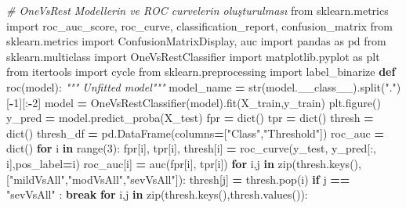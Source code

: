 \documentclass[12pt,twoside]{deuthesis}
\newenvironment{Shaded}{\begin{snugshade}}{\end{snugshade}}
\newcommand{\BuiltInTok}[1]{#1}
\newcommand{\CommentTok}[1]{\textcolor[rgb]{0.56,0.35,0.01}{\textit{#1}}}
\newcommand{\ControlFlowTok}[1]{\textcolor[rgb]{0.13,0.29,0.53}{\textbf{#1}}}
\newcommand{\DecValTok}[1]{\textcolor[rgb]{0.00,0.00,0.81}{#1}}
\newcommand{\ImportTok}[1]{#1}
\newcommand{\KeywordTok}[1]{\textcolor[rgb]{0.13,0.29,0.53}{\textbf{#1}}}
\newcommand{\NormalTok}[1]{#1}
\newcommand{\OperatorTok}[1]{\textcolor[rgb]{0.81,0.36,0.00}{\textbf{#1}}}
\newcommand{\StringTok}[1]{\textcolor[rgb]{0.31,0.60,0.02}{#1}}
\begin{document}
\scriptsize
\begin{Shaded}
\begin{Highlighting}[]
\CommentTok{\# OneVsRest Modellerin ve ROC curvelerin oluşturulması}
\ImportTok{from}\NormalTok{ sklearn.metrics }\ImportTok{import}\NormalTok{ roc\_auc\_score, roc\_curve, classification\_report, confusion\_matrix}
\ImportTok{from}\NormalTok{ sklearn.metrics }\ImportTok{import}\NormalTok{ ConfusionMatrixDisplay, auc}
\ImportTok{import}\NormalTok{ pandas }\ImportTok{as}\NormalTok{ pd}
\ImportTok{from}\NormalTok{ sklearn.multiclass }\ImportTok{import}\NormalTok{ OneVsRestClassifier}
\ImportTok{import}\NormalTok{ matplotlib.pyplot }\ImportTok{as}\NormalTok{ plt}
\ImportTok{from}\NormalTok{ itertools }\ImportTok{import}\NormalTok{ cycle}
\ImportTok{from}\NormalTok{ sklearn.preprocessing }\ImportTok{import}\NormalTok{ label\_binarize}
\KeywordTok{def}\NormalTok{ roc(model):}
    \CommentTok{""" Unfitted model"""}
\NormalTok{    model\_name }\OperatorTok{=} \BuiltInTok{str}\NormalTok{(model.\_\_class\_\_).split(}\StringTok{"."}\NormalTok{)[}\OperatorTok{{-}}\DecValTok{1}\NormalTok{][:}\OperatorTok{{-}}\DecValTok{2}\NormalTok{]}
\NormalTok{    model }\OperatorTok{=}\NormalTok{ OneVsRestClassifier(model).fit(X\_train,y\_train)}
\NormalTok{    plt.figure()}
\NormalTok{    y\_pred }\OperatorTok{=}\NormalTok{ model.predict\_proba(X\_test)}
\NormalTok{    fpr }\OperatorTok{=} \BuiltInTok{dict}\NormalTok{()}
\NormalTok{    tpr }\OperatorTok{=} \BuiltInTok{dict}\NormalTok{()}
\NormalTok{    thresh }\OperatorTok{=} \BuiltInTok{dict}\NormalTok{()}
\NormalTok{    thresh\_df }\OperatorTok{=}\NormalTok{ pd.DataFrame(columns}\OperatorTok{=}\NormalTok{[}\StringTok{"Class"}\NormalTok{,}\StringTok{"Threshold"}\NormalTok{])}
\NormalTok{    roc\_auc }\OperatorTok{=} \BuiltInTok{dict}\NormalTok{()}
    \ControlFlowTok{for}\NormalTok{ i }\KeywordTok{in} \BuiltInTok{range}\NormalTok{(}\DecValTok{3}\NormalTok{):}
\NormalTok{        fpr[i], tpr[i], thresh[i] }\OperatorTok{=}\NormalTok{ roc\_curve(y\_test, y\_pred[:, i],pos\_label}\OperatorTok{=}\NormalTok{i)}
\NormalTok{        roc\_auc[i] }\OperatorTok{=}\NormalTok{ auc(fpr[i], tpr[i])}
    \ControlFlowTok{for}\NormalTok{ i,j }\KeywordTok{in} \BuiltInTok{zip}\NormalTok{(thresh.keys(),[}\StringTok{"mildVsAll"}\NormalTok{,}\StringTok{"modVsAll"}\NormalTok{,}\StringTok{"sevVsAll"}\NormalTok{]):}
\NormalTok{        thresh[j] }\OperatorTok{=}\NormalTok{ thresh.pop(i)}
        \ControlFlowTok{if}\NormalTok{ j }\OperatorTok{==} \StringTok{"sevVsAll"}\NormalTok{ : }\ControlFlowTok{break}
    \ControlFlowTok{for}\NormalTok{ i,j }\KeywordTok{in} \BuiltInTok{zip}\NormalTok{(thresh.keys(),thresh.values()):}

\end{Highlighting}
\end{Shaded}
\end{document}
